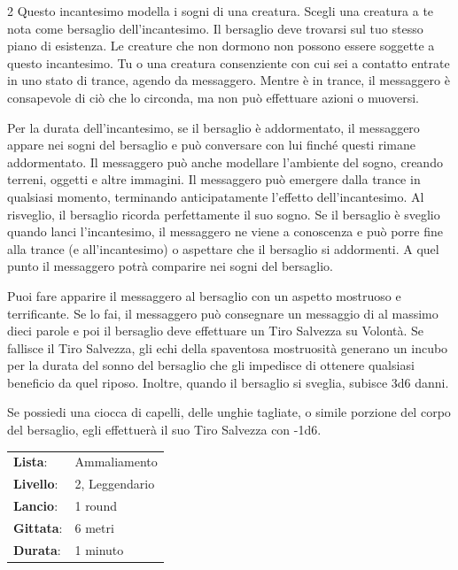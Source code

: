 \begin{multicols}{2}
Questo incantesimo modella i sogni di una creatura. Scegli una creatura a te nota come bersaglio dell'incantesimo. Il bersaglio deve trovarsi sul tuo stesso piano di esistenza. Le creature che non dormono non possono essere soggette a questo incantesimo. Tu o una creatura consenziente con cui sei a contatto entrate in uno stato di trance, agendo da messaggero. Mentre è in trance, il messaggero è consapevole di ciò che lo circonda, ma non può effettuare azioni o muoversi.

Per la durata dell'incantesimo, se il bersaglio è addormentato, il messaggero appare nei sogni del bersaglio e può conversare con lui finché questi rimane addormentato. Il messaggero può anche modellare l'ambiente del sogno, creando terreni, oggetti e altre immagini. Il messaggero può emergere dalla trance in qualsiasi momento, terminando anticipatamente l'effetto dell'incantesimo. Al risveglio, il bersaglio ricorda perfettamente il suo sogno. Se il bersaglio è sveglio quando lanci l'incantesimo, il messaggero ne viene a conoscenza e può porre fine alla trance (e all'incantesimo) o aspettare che il bersaglio si addormenti. A quel punto il messaggero potrà comparire nei sogni del bersaglio.

Puoi fare apparire il messaggero al bersaglio con un aspetto mostruoso e terrificante. Se lo fai, il messaggero può consegnare un messaggio di al massimo dieci parole e poi il bersaglio deve effettuare un Tiro Salvezza su Volontà. Se fallisce il Tiro Salvezza, gli echi della spaventosa mostruosità generano un incubo per la durata del sonno del bersaglio che gli impedisce di ottenere qualsiasi beneficio da quel riposo. Inoltre, quando il bersaglio si sveglia, subisce 3d6 danni.

Se possiedi una ciocca di capelli, delle unghie tagliate, o simile porzione del corpo del bersaglio, egli effettuerà il suo Tiro Salvezza con -1d6.

\noindent\begin{tabularx}{\linewidth}{p{1.9cm}X}
	\rowcolor{gray!20}\textbf{Lista}: & Ammaliamento \\
	\textbf{Livello}: & 2, Leggendario \\
	\rowcolor{gray!20}\textbf{Lancio}: & 1 round \\
	\textbf{Gittata}: & 6 metri \\
	\rowcolor{gray!20}\textbf{Durata}: & 1 minuto \\
\end{tabularx}\smallskip


\end{multicols}
